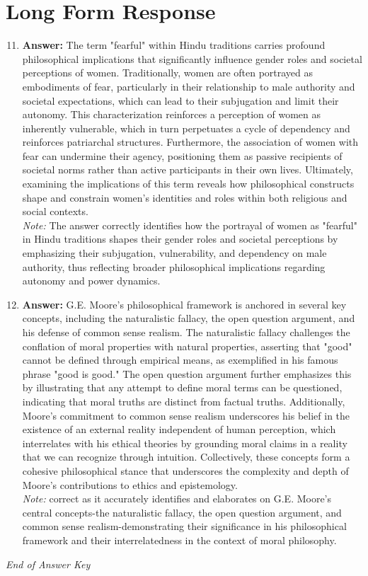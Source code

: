 \documentclass[12pt]{article}
\begin{document}
\section*{Long Form Response}
\begin{enumerate}[label=\arabic*.]
\setcounter{enumi}{10}
\item \textbf{Answer:} The term "fearful" within Hindu traditions carries profound philosophical implications that significantly influence gender roles and societal perceptions of women. Traditionally, women are often portrayed as embodiments of fear, particularly in their relationship to male authority and societal expectations, which can lead to their subjugation and limit their autonomy. This characterization reinforces a perception of women as inherently vulnerable, which in turn perpetuates a cycle of dependency and reinforces patriarchal structures. Furthermore, the association of women with fear can undermine their agency, positioning them as passive recipients of societal norms rather than active participants in their own lives. Ultimately, examining the implications of this term reveals how philosophical constructs shape and constrain women's identities and roles within both religious and social contexts.
\\ \textit{Note:} The answer correctly identifies how the portrayal of women as "fearful" in Hindu traditions shapes their gender roles and societal perceptions by emphasizing their subjugation, vulnerability, and dependency on male authority, thus reflecting broader philosophical implications regarding autonomy and power dynamics.
\item \textbf{Answer:} G.E. Moore's philosophical framework is anchored in several key concepts, including the naturalistic fallacy, the open question argument, and his defense of common sense realism. The naturalistic fallacy challenges the conflation of moral properties with natural properties, asserting that "good" cannot be defined through empirical means, as exemplified in his famous phrase "good is good." The open question argument further emphasizes this by illustrating that any attempt to define moral terms can be questioned, indicating that moral truths are distinct from factual truths. Additionally, Moore's commitment to common sense realism underscores his belief in the existence of an external reality independent of human perception, which interrelates with his ethical theories by grounding moral claims in a reality that we can recognize through intuition. Collectively, these concepts form a cohesive philosophical stance that underscores the complexity and depth of Moore's contributions to ethics and epistemology.
\\ \textit{Note:} correct as it accurately identifies and elaborates on G.E. Moore's central concepts-the naturalistic fallacy, the open question argument, and common sense realism-demonstrating their significance in his philosophical framework and their interrelatedness in the context of moral philosophy.
\end{enumerate}

\vfill
\noindent\textit{End of Answer Key}
\end{document}
